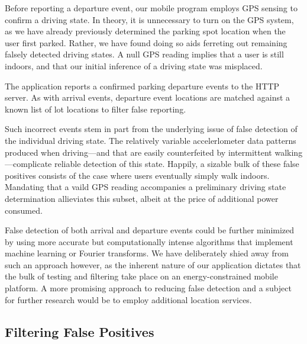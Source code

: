 Before reporting a departure event, our mobile program employs GPS sensing
to confirm a driving state.  In theory, it is unnecessary to turn on the
GPS system, as we have already previously determined the parking spot
location when the user first parked.  Rather, we have found doing so aids
ferreting out remaining falsely detected driving states.  A null GPS reading
implies that a user is still indoors, and that our initial inference of a
driving state was misplaced.

The application reports a confirmed parking departure events to the
HTTP server.  As with arrival events, departure event locations are matched
against a known list of lot locations to filter false reporting.

Such incorrect events stem in part from the underlying issue of false
detection of the individual driving state.  The relatively variable
accelerlometer data patterns produced when driving---and that are easily
counterfeited by intermittent walking---complicate reliable detection of this
state.  Happily, a sizable bulk of these false positives consists of the case
where users eventually simply walk indoors.  Mandating that a vaild GPS
reading accompanies a preliminary driving state determination allieviates this
subset, albeit at the price of additional power consumed.

False detection of both arrival and departure events could be further
minimized by using more accurate but computationally intense algorithms that
implement machine learning or Fourier transforms.  We have deliberately shied
away from such an approach however, as the inherent nature of our application
dictates that the bulk of testing and filtering take place on an
energy-constrained mobile platform.  A more promising approach to reducing
false detection and a subject for further research would be to employ
additional location services.


\subsection{Filtering False Positives}

